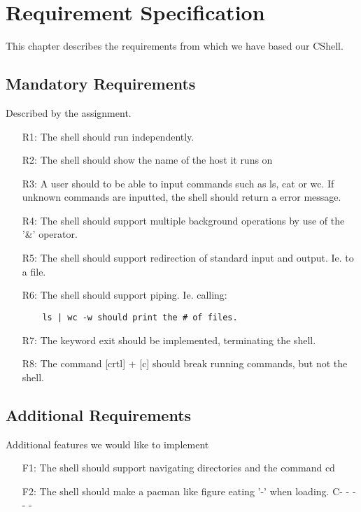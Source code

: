\chapter{Requirement Specification}
This chapter describes the requirements from which we have based our CShell.

\section{Mandatory Requirements}
Described by the assignment.

\begin{itemize}[leftmargin=25mm]

\item[R1:] The shell should run independently.
\item[R2:] The shell should show the name of the host it runs on
\item[R3:] A user should to be able to input commands such as ls, cat or wc. If unknown commands are inputted, the shell should return a error message.
\item[R4:] The shell should support multiple background operations by use of the '\&' operator.
\item[R5:] The shell should support redirection of standard input and output. Ie. to a file.
\item[R6:] The shell should support piping. Ie. calling: \begin{verbatim}
	ls | wc -w should print the # of files.
\end{verbatim}
\item[R7:] The keyword exit should be implemented, terminating the shell.
\item[R8:] The command [crtl] + [c] should break running commands, but not the shell.

\end{itemize}

\section{Additional Requirements}
Additional features we would like to implement

\begin{itemize}[leftmargin=25mm]

\item[F1:] The shell should support navigating directories and the command cd
\item[F2:] The shell should make a pacman like figure eating '-' when loading.
 C- - - - -

\end{itemize}